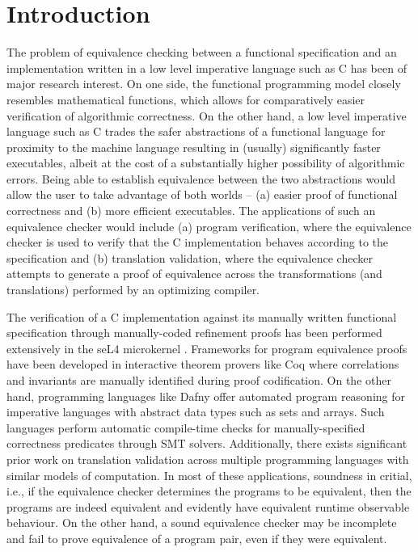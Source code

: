 \chapter{Introduction}
\label{sec:intro}
The problem of equivalence checking between a functional specification and an
implementation written in a low level imperative language such as C
has been of major research interest.
On one side, the functional programming model closely resembles mathematical functions,
which allows for comparatively easier verification of algorithmic correctness.
On the other hand, a low level imperative language such as C trades the safer abstractions of a functional
language for proximity to the machine language resulting in (usually) significantly faster executables, albeit at the cost of
a substantially higher possibility of algorithmic errors.
Being able to establish equivalence between the two abstractions would allow the user
to take advantage of both worlds -- (a) easier proof of functional correctness and
(b) more efficient executables.
The applications of such an equivalence checker would include (a) program verification, where
the equivalence checker is used to verify that the C implementation
behaves according to the specification and (b) translation validation, where
the equivalence checker attempts to generate a proof of equivalence across
the transformations (and translations) performed by an optimizing compiler.

The verification of a C implementation against its manually written
functional specification through manually-coded refinement proofs has been
performed extensively in the seL4 microkernel \cite{seL4}.
Frameworks for program equivalence proofs have been developed in interactive
theorem provers like Coq \cite{programEquivalenceInCoq} where correlations and invariants
are manually identified during proof codification.
On the other hand, programming languages like Dafny \cite{dafny} offer automated program
reasoning for imperative languages with abstract data types such as sets and arrays.
Such languages perform automatic compile-time checks for manually-specified
correctness predicates through SMT solvers.
Additionally, there exists significant prior work on translation validation
\cite{tvi,tristan_tv_eqsat11,stepp_eqsat_llvm11,eqsat,pec,zuck03,zuck05,heffter05,covac,c_to_verilog,kanade09,lopes16,tvoc_cav05,ddec,semalign,oopsla20,tv_oskernel,namjoshi13}
across multiple programming languages with similar models of computation.
In most of these applications, soundness in critial,
i.e., if the equivalence checker determines the programs to be equivalent, then the programs are indeed equivalent
and evidently have equivalent runtime observable behaviour. On the other hand, a sound equivalence checker may be incomplete
and fail to prove equivalence of a program pair, even if they were equivalent.

